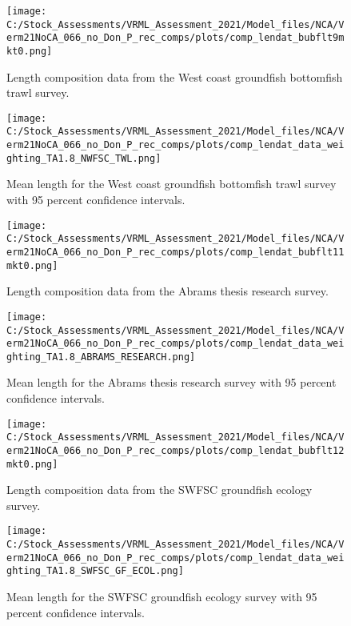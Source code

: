 \documentclass[11pt,
  english,
  a4paper,
]{article}
\begin{document}
\begin{figure}
\centering
\texttt{[image: C:/Stock\_Assessments/VRML\_Assessment\_2021/Model\_files/NCA/Verm21NoCA\_066\_no\_Don\_P\_rec\_comps/plots/comp\_lendat\_bubflt9mkt0.png]}
\caption{Length composition data from the West coast groundfish bottomfish trawl survey.\label{fig:len-data-NWFSC-TWL}}
\end{figure}

\begin{figure}
\centering
\texttt{[image: C:/Stock\_Assessments/VRML\_Assessment\_2021/Model\_files/NCA/Verm21NoCA\_066\_no\_Don\_P\_rec\_comps/plots/comp\_lendat\_data\_weighting\_TA1.8\_NWFSC\_TWL.png]}
\caption{Mean length for the West coast groundfish bottomfish trawl survey with 95 percent confidence intervals.\label{fig:mean-com-len-data-NWFSC-TWL}}
\end{figure}

\begin{figure}
\centering
\texttt{[image: C:/Stock\_Assessments/VRML\_Assessment\_2021/Model\_files/NCA/Verm21NoCA\_066\_no\_Don\_P\_rec\_comps/plots/comp\_lendat\_bubflt11mkt0.png]}
\caption{Length composition data from the Abrams thesis research survey.\label{fig:len-data-ABRAMS-RESEARCH}}
\end{figure}

\begin{figure}
\centering
\texttt{[image: C:/Stock\_Assessments/VRML\_Assessment\_2021/Model\_files/NCA/Verm21NoCA\_066\_no\_Don\_P\_rec\_comps/plots/comp\_lendat\_data\_weighting\_TA1.8\_ABRAMS\_RESEARCH.png]}
\caption{Mean length for the Abrams thesis research survey with 95 percent confidence intervals.\label{fig:mean-com-len-data-ABRAMS-RESEARCH}}
\end{figure}

\begin{figure}
\centering
\texttt{[image: C:/Stock\_Assessments/VRML\_Assessment\_2021/Model\_files/NCA/Verm21NoCA\_066\_no\_Don\_P\_rec\_comps/plots/comp\_lendat\_bubflt12mkt0.png]}
\caption{Length composition data from the SWFSC groundfish ecology survey.\label{fig:len-data-SWFSC-GF-ECOL}}
\end{figure}

\begin{figure}
\centering
\texttt{[image: C:/Stock\_Assessments/VRML\_Assessment\_2021/Model\_files/NCA/Verm21NoCA\_066\_no\_Don\_P\_rec\_comps/plots/comp\_lendat\_data\_weighting\_TA1.8\_SWFSC\_GF\_ECOL.png]}
\caption{Mean length for the SWFSC groundfish ecology survey with 95 percent confidence intervals.\label{fig:mean-com-len-data-SWFSC-GF-ECOL}}
\end{figure}
\end{document}

